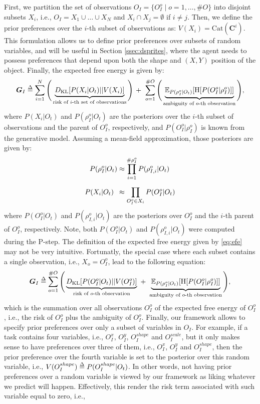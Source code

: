 \documentclass[twoside,11pt]{article}
\def\delequal{\mathrel{\ensurestackMath{\stackon[1pt]{=}{\scriptstyle\Delta}}}}
\newcommand{\nb}[1]{\# #1}
\begin{document}
First, we partition the set of observations $O_I = \{O_I^o \mid o = 1, \hdots, \nb{O}\}$ into disjoint subsets $X_i$, i.e., $O_I = X_1 \cup \hdots \cup X_N$ and $X_i \cap X_j = \emptyset$ if $i \neq j$. Then, we define the prior preferences over the $i$-th subset of observations as: $V(X_i) = \text{Cat}(\bm{C}^i)$. This formulation allows us to define prior preferences over subsets of random variables, and will be useful in Section \ref{ssec:dsprites}, where the agent needs to possess preferences that depend upon both the shape and $(X, Y)$ position of the object. Finally, the expected free energy is given by:
\begin{align}\label{eq:efe}
\bm{G}_I \delequal \sum_{i=1}^{N} \Bigg( \underbrace{D_{\mathrm{KL}}[P(X_i|O_t)||V(X_i)]}_{\text{risk of } i \text{-th set of observations}}\Bigg)\, +\,\, \sum_{o=1}^{\nb{O}} \Bigg( \underbrace{\mathbb{E}_{P(\rho_I^o|O_t)}[\text{H}[P(O_I^o | \rho_I^o)]]}_{\text{ambiguity of } o \text{-th observation}}\Bigg),
\end{align}
where $P(X_i|O_t)$ and $P(\rho_I^o|O_t)$ are the posteriors over the $i$-th subset of observations and the parent of $O_I^o$, respectively, and $P(O_I^o | \rho_I^o)$ is known from the generative model. Assuming a mean-field approximation, those posteriors are given by:
\begin{align*}
P(\rho_I^o|O_t) &\approx \prod_{i = 1}^{\nb{\rho_I^o}} P(\rho_{I,i}^o|O_t)\\
P(X_i|O_t) \,\,\, &\approx \prod_{O_I^o \in X_i}^{{\color{white}x}} P(O_I^o|O_t)
\end{align*}
where $P(O_I^o|O_t)$ and $P(\rho_{I,i}^o|O_t)$ are the posteriors over $O_I^o$ and the $i$-th parent of $O_I^o$, respectively. Note, both $P(O_I^o|O_t)$ and $P(\rho_{I,i}^o|O_t)$ were computed during the P-step. The definition of the expected free energy given by \eqref{eq:efe} may not be very intuitive. Fortunatly, the special case where each subset contains a single observation, i.e., $X_o = O_I^o$, lead to the following equation:
\begin{align*}
\bm{G}_I \delequal \sum_{o=1}^{\nb{O}} \Bigg( \underbrace{D_{\mathrm{KL}}[P(O_I^o|O_t)||V(O_I^o)]}_{\text{risk of } o \text{-th observation}} \,\, +\,\, \underbrace{\mathbb{E}_{P(\rho_I^o|O_t)}[\text{H}[P(O_I^o | \rho_I^o)]]}_{\text{ambiguity of } o \text{-th observation}}\Bigg),
\end{align*}
which is the summation over all observations $O_I^o$ of the expected free energy of $O_I^o$, i.e., the risk of $O_I^o$ plus the ambiguity of $O_I^o$. Finally, our framework allows to specify prior preferences over only a subset of variables in $O_I$. For example, if a task contains four variables, i.e., $O_I^x$, $O_I^y$, $O_I^{shape}$ and $O_I^{scale}$, but it only makes sense to have preferences over three of them, i.e., $O_I^x$, $O_I^y$ and $O_I^{shape}$, then the prior preference over the fourth variable is set to the posterior over this random variable, i.e., $V(O_I^{shape}) \delequal P(O_I^{shape}|O_t)$. In other words, not having prior preferences over a random variable is viewed by our framework as liking whatever we predict will happen. Effectively, this render the risk term associated with such variable equal to zero, i.e., 
\end{document}
